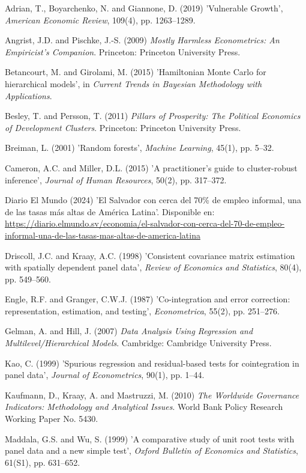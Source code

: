 \documentclass[11pt,a4paper]{article}
\begin{document}
Adrian, T., Boyarchenko, N. and Giannone, D. (2019) 'Vulnerable Growth', \textit{American Economic Review}, 109(4), pp. 1263--1289.

Angrist, J.D. and Pischke, J.-S. (2009) \textit{Mostly Harmless Econometrics: An Empiricist's Companion}. Princeton: Princeton University Press.

Betancourt, M. and Girolami, M. (2015) 'Hamiltonian Monte Carlo for hierarchical models', in \textit{Current Trends in Bayesian Methodology with Applications}.

Besley, T. and Persson, T. (2011) \textit{Pillars of Prosperity: The Political Economics of Development Clusters}. Princeton: Princeton University Press.

Breiman, L. (2001) 'Random forests', \textit{Machine Learning}, 45(1), pp. 5--32.

Cameron, A.C. and Miller, D.L. (2015) 'A practitioner's guide to cluster-robust inference', \textit{Journal of Human Resources}, 50(2), pp. 317--372.

Diario El Mundo (2024) 'El Salvador con cerca del 70\% de empleo informal, una de las tasas más altas de América Latina'. Disponible en: \url{https://diario.elmundo.sv/economia/el-salvador-con-cerca-del-70-de-empleo-informal-una-de-las-tasas-mas-altas-de-america-latina}

Driscoll, J.C. and Kraay, A.C. (1998) 'Consistent covariance matrix estimation with spatially dependent panel data', \textit{Review of Economics and Statistics}, 80(4), pp. 549--560.

Engle, R.F. and Granger, C.W.J. (1987) 'Co-integration and error correction: representation, estimation, and testing', \textit{Econometrica}, 55(2), pp. 251--276.

Gelman, A. and Hill, J. (2007) \textit{Data Analysis Using Regression and Multilevel/Hierarchical Models}. Cambridge: Cambridge University Press.

Kao, C. (1999) 'Spurious regression and residual-based tests for cointegration in panel data', \textit{Journal of Econometrics}, 90(1), pp. 1--44.

Kaufmann, D., Kraay, A. and Mastruzzi, M. (2010) \textit{The Worldwide Governance Indicators: Methodology and Analytical Issues}. World Bank Policy Research Working Paper No. 5430.

Maddala, G.S. and Wu, S. (1999) 'A comparative study of unit root tests with panel data and a new simple test', \textit{Oxford Bulletin of Economics and Statistics}, 61(S1), pp. 631--652.
\end{document}
